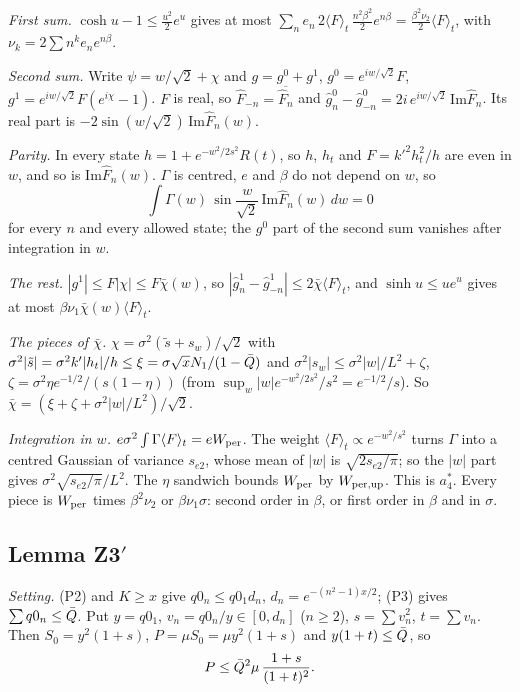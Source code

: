 \emph{First sum.} $\cosh u-1\le\frac{u^2}2e^u$ gives at most $\sum_ne_n\,2\langle F\rangle_t\,\frac{n^2\beta^2}2e^{n\beta}=\frac{\beta^2\nu_2}2\langle F\rangle_t$, with $\nu_k=2\sum n^ke_ne^{n\beta}$.

\emph{Second sum.} Write $\psi=w/\sqrt2+\chi$ and $g=g^0+g^1$, $g^0=e^{iw/\sqrt2}F$, $g^1=e^{iw/\sqrt2}F(e^{i\chi}-1)$.
$F$ is real, so $\hat F_{-n}=\overline{\hat F_n}$ and $\hat g^0_n-\hat g^0_{-n}=2i\,e^{iw/\sqrt2}\,\mathrm{Im}\hat F_n$.
Its real part is $-2\sin(w/\sqrt2)\,\mathrm{Im}\hat F_n(w)$.

\emph{Parity.} In every state $h=1+e^{-w^2/2s^2}R(t)$, so $h$, $h_t$ and $F=k'^2h_t^2/h$ are even in $w$, and so is $\mathrm{Im}\hat F_n(w)$.
$\Gamma$ is centred, $e$ and $\beta$ do not depend on $w$, so
\begin{equation}
\int\Gamma(w)\,\sin\frac w{\sqrt2}\,\mathrm{Im}\hat F_n(w)\,dw=0
\end{equation}
for every $n$ and every allowed state; the $g^0$ part of the second sum vanishes after integration in $w$.

\emph{The rest.} $|g^1|\le F|\chi|\le F\bar\chi(w)$, so $|\hat g^1_n-\hat g^1_{-n}|\le2\bar\chi\langle F\rangle_t$, and $\sinh u\le ue^u$ gives at most $\beta\nu_1\bar\chi(w)\langle F\rangle_t$.

\emph{The pieces of $\bar\chi$.} $\chi=\sigma^2(\tilde s+s_w)/\sqrt2$ with $\sigma^2|\tilde s|=\sigma^2k'|h_t|/h\le\xi=\sigma\sqrt xN_1/(1-\bar Q)$ and $\sigma^2|s_w|\le\sigma^2|w|/L^2+\zeta$, $\zeta=\sigma^2\eta e^{-1/2}/(s(1-\eta))$ (from $\sup_w|w|e^{-w^2/2s^2}/s^2=e^{-1/2}/s$).
So $\bar\chi=(\xi+\zeta+\sigma^2|w|/L^2)/\sqrt2$.

\emph{Integration in $w$.} $e\sigma^2\int\Gamma\langle F\rangle_t=eW_{\rm per}$.
The weight $\langle F\rangle_t\propto e^{-w^2/s^2}$ turns $\Gamma$ into a centred Gaussian of variance $s_{e2}$, whose mean of $|w|$ is $\sqrt{2s_{e2}/\pi}$; so the $|w|$ part gives $\sigma^2\sqrt{s_{e2}/\pi}/L^2$.
The $\eta$ sandwich bounds $W_{\rm per}$ by $W_{\rm per,up}$.
This is $a_4^*$.
Every piece is $W_{\rm per}$ times $\beta^2\nu_2$ or $\beta\nu_1\sigma$: second order in $\beta$, or first order in $\beta$ and in $\sigma$.

\subsection{Lemma Z3\texorpdfstring{$'$}{'}}
\label{app:details:Z3}
\emph{Setting.} (P2) and $K\ge x$ give $q0_n\le q0_1d_n$, $d_n=e^{-(n^2-1)x/2}$; (P3) gives $\sum q0_n\le\bar Q$.
Put $y=q0_1$, $v_n=q0_n/y\in[0,d_n]$ ($n\ge2$), $s=\sum v_n^2$, $t=\sum v_n$.
Then $S_0=y^2(1+s)$, $P=\mu S_0=\mu y^2(1+s)$ and $y(1+t)\le\bar Q$, so
\begin{equation}
P\le\bar Q^2\mu\,\frac{1+s}{(1+t)^2}.
\end{equation}

